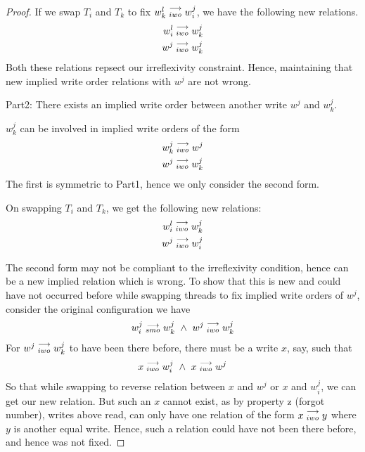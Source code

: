 \begin{proof}
                    If we swap $T_i$ and $T_k$ to fix $w_k^l\stackrel{\longrightarrow}{_{iwo}}w_i^j$, we have the following new relations.
                    \begin{align}
                        w_i^l\stackrel{\longrightarrow}{_{iwo}}w_k^j \\
                        w^j\stackrel{\longrightarrow}{_{iwo}}w_k^j
                    \end{align}
                    Both these relations repsect our irreflexivity constraint. Hence, maintaining that new implied write order relations with $w^j$ are not wrong.
                    
                Part2: There exists an implied write order between another write $w^j$ and $w_k^j$. 
                    
                    $w_k^j$ can be involved in implied write orders of the form
                    \begin{align}
                        w_k^j\stackrel{\longrightarrow}{_{iwo}}w^j \\
                        w^j\stackrel{\longrightarrow}{_{iwo}}w_k^j 
                    \end{align}
                    The first is symmetric to Part1, hence we only consider the second form. 

                    On swapping $T_i$ and $T_k$, we get the following new relations:
                    \begin{align}
                        w_i^l\stackrel{\longrightarrow}{_{iwo}}w_k^j \\
                        w^j\stackrel{\longrightarrow}{_{iwo}}w_i^j
                    \end{align}

                    The second form may not be compliant to the irreflexivity condition, hence can be a new implied relation which is wrong. To show that this is new and could have not occurred before while swapping threads to fix implied write orders of $w^j$, consider the original configuration we have 
                    \begin{align}
                        \reln{w_i^j}{smo}{w_k^j} \ \wedge \ \reln{w^j}{iwo}{w_k^j}
                    \end{align}
                    For $w^j\stackrel{\longrightarrow}{_{iwo}}w_k^j$ to have been there before, there must be a write $x$, say, such that 
                    \begin{align}
                        \reln{x}{iwo}{w_i^j} \ \wedge \ \reln{x}{iwo}{w^j}
                    \end{align}
                    So that while swapping to reverse relation between $x$ and $w^j$ or $x$ and $w_i^j$, we can get our new relation. But such an $x$ cannot exist, as by property z (forgot number), writes above read, can only have one relation of the form $x\stackrel{\longrightarrow}{_{iwo}}y$ where $y$ is another equal write. Hence, such a relation could have not been there before, and hence was not fixed. 


\end{proof}
